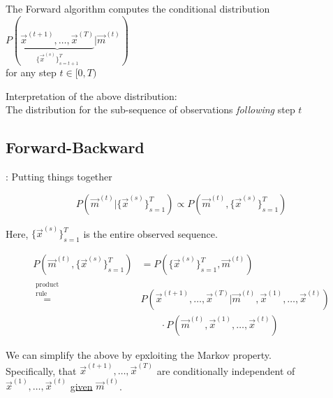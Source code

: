 \begin{frame}{\subsecname}

The Forward algorithm computes the conditional distribution
$
P(
\underbrace{\vec x^{(t+1)}, \ldots, \vec x^{(T)}
}_{
\{\vec x^{(s)}\}_{s=t+1}^T
} | \vec m^{(t)})
$\\
for any step $t \in \lbrack0, T)$

Interpretation of the above distribution:\\

The distribution for the sub-sequence of observations \emph{following} step $t$


\end{frame}

\subsection{Forward-Backward}

\begin{frame}{\subsecname: Putting things together}

\begin{equation}
P(
\vec m^{(t)} | \{\vec x^{(s)}\}_{s=1}^T )
\propto 
P(\vec m^{(t)} , \{\vec x^{(s)}\}_{s=1}^T)
\end{equation}

Here, $\{\vec x^{(s)}\}_{s=1}^T$ is the entire observed sequence.

\pause

\begin{align}
P(\vec m^{(t)} , \{\vec x^{(s)}\}_{s=1}^T)
&= 
P( \{\vec x^{(s)}\}_{s=1}^T, \vec m^{(t)})\\
\stackrel{\substack{\text{product}\\\text{rule}}}{=}&
P( \vec x^{(t+1)}, \ldots, \vec x^{(T)} | \vec m^{(t)}, \vec x^{(1)}, \ldots, \vec x^{(t)})\\
&\qquad\cdot 
P(\vec m^{(t)}, \vec x^{(1)}, \ldots, \vec x^{(t)}) 
\end{align}

\pause

We can simplify the above by epxloiting the Markov property.\\
Specifically, that
$\vec x^{(t+1)}, \ldots, \vec x^{(T)}$ are conditionally independent of $\vec x^{(1)}, \ldots, \vec x^{(t)}$ \underline{given} $\vec m^{(t)}$.



\end{frame}


